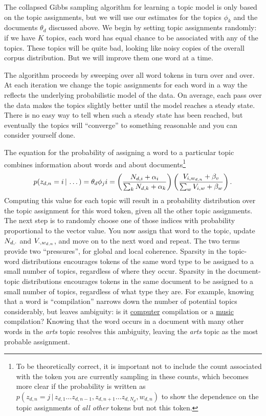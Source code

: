 The collapsed Gibbs sampling algorithm for learning a topic model is
only based on the topic assignments, but we will use our estimates for
the topics $\phi_k$ and the documents $\theta_d$ discussed above.  We
begin by setting topic assignments randomly: if we have $K$ topics,
each word has equal chance to be associated with any of the topics.
These topics will be quite bad, looking like noisy copies of the
overall corpus distribution. But we will improve them one word at a
time.

The algorithm proceeds by sweeping over all word tokens in turn over and over.
At each iteration we change the topic assignments for each word in a way the reflects the
underlying probabilistic model of the data.  On average, each pass over the data makes the
topics slightly better until the model reaches a steady state.  There is no easy way
to tell when such a steady state has been reached, but eventually the topics will ``converge'' to something reasonable and you can consider yourself done.

The equation for the probability of assigning a word to a particular topic
combines information about words and about documents\footnote{To be theoretically correct, it is important
not to include the count associated with the token you are currently sampling in
these counts, which becomes more clear if the probability is written as
$p(z_{d,n}=j\,|\,z_{d,1}\dots z_{d,n-1},z_{d,n+1}\dots z_{d,N_d}, w_{d,n})$ to
show the dependence on the topic assignments of \emph{all other} tokens but not
this token.}
\begin{align}
p(z_{d,n}=i \, | \, \dots) = \theta_d
\phi_ji= \left(\frac{N_{d,i} + \alpha_i}{\sum_k N_{d,k} + \alpha_k} \right) \left( \frac{V_{i,w_{d,n}} + \beta_v}{\sum_w V_{i,w} +
    \beta_w} \right).
\label{eq:sampling}
\end{align}
Computing this value for each topic will result in a probability distribution over the topic assignment for this word token, given all the other topic assignments.  The next step is to randomly choose one of those indices with
probability proportional to the vector value.  You now assign that word to the
topic, update $N_{d,\cdot}$ and $V_{\cdot,w_{d,n}}$, and move on to the next word and repeat.
The two terms provide two ``pressures'', for global and local coherence. Sparsity in the topic-word distributions encourages tokens of the same word type to be assigned to a small number of topics,  regardless of where they occur. Sparsity in the document-topic distributions encourages tokens in the same document to be assigned to a small number of topics, regardless of what type they are.
For example, knowing that a word is ``compilation'' narrows down the
number of potential topics considerably, but leaves ambiguity: is it
\underline{computer} compilation or a \underline{music} compilation? Knowing that the word occurs in a document with many other words in the \emph{arts} topic resolves this ambiguity, leaving the \emph{arts} topic as the most probable assignment.

